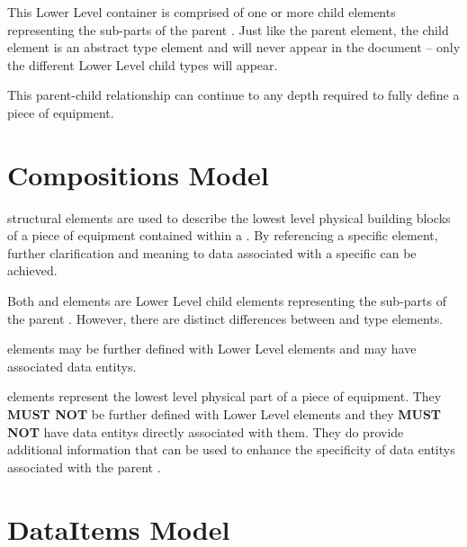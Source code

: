 This \gls{Lower Level}  container is comprised of one or more child  elements representing the sub-parts of the parent . Just like the parent  element, the child  element is an abstract type element and will never appear in the document – only the different \gls{Lower Level} child  types will appear.

This parent-child relationship can continue to any depth required to fully define a piece of equipment.







\section{Compositions Model}
\label{sec:Compositions Model}

 \glspl{structural element} are used to describe the lowest level physical building blocks of a piece of equipment contained within a . By referencing a specific  element, further clarification and meaning to data associated with a specific  can be achieved.

Both  and  elements are \gls{Lower Level} child elements representing the sub-parts of the parent .  However, there are distinct differences between  and  type elements.

 elements may be further defined with \gls{Lower Level}  elements and may have associated \glspl{data entity}.

 elements represent the lowest level physical part of a piece of equipment.  They \textbf{MUST NOT} be further defined with \gls{Lower Level}  elements and they \textbf{MUST NOT} have \glspl{data entity} directly associated with them.   They do provide additional information that can be used to enhance the specificity of \glspl{data entity} associated with the parent .





\section{DataItems Model}
\label{sec:DataItems Model}

